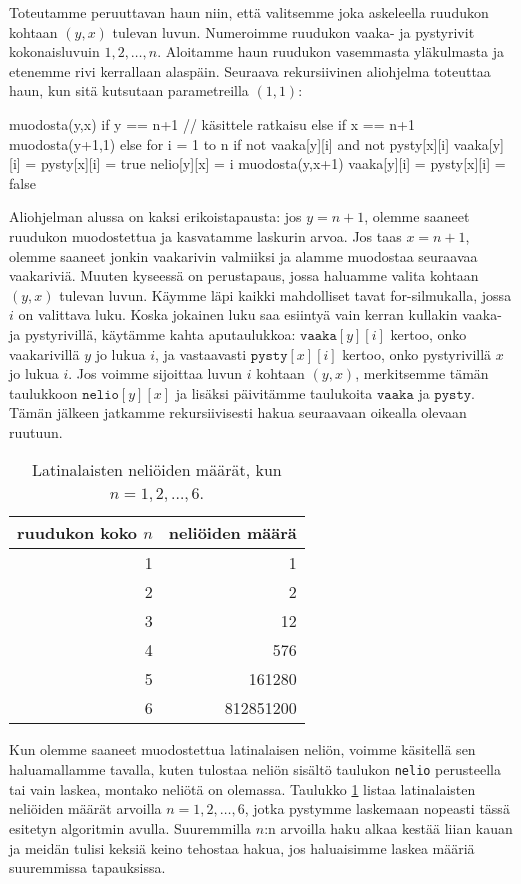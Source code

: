 Toteutamme peruuttavan haun niin, että valitsemme joka askeleella
ruudukon kohtaan $(y,x)$ tulevan luvun.
Numeroimme ruudukon vaaka- ja pystyrivit kokonaisluvuin $1,2,\dots,n$.
Aloitamme haun ruudukon vasemmasta yläkul\-masta ja etenemme
rivi kerrallaan alaspäin.
Seuraava rekursiivinen aliohjelma toteuttaa haun,
kun sitä kutsutaan parametreilla $(1,1)$:

\begin{code}
muodosta(y,x)
    if y == n+1
        // käsittele ratkaisu
    else if x == n+1
        muodosta(y+1,1)
    else
        for i = 1 to n
            if not vaaka[y][i] and not pysty[x][i]
                vaaka[y][i] = pysty[x][i] = true
                nelio[y][x] = i
                muodosta(y,x+1)
                vaaka[y][i] = pysty[x][i] = false
\end{code}

Aliohjelman alussa on kaksi erikoistapausta:
jos $y=n+1$, olemme saaneet ruudukon muodostettua
ja kasvatamme laskurin arvoa.
Jos taas $x=n+1$, olemme saaneet jonkin vaakarivin
valmiiksi ja alamme muodostaa seuraavaa vaakariviä.
Muuten kyseessä on perustapaus, jossa haluamme
valita kohtaan $(y,x)$ tulevan luvun.
Käymme läpi kaikki mahdolliset tavat for-silmukalla,
jossa $i$ on valittava luku.
Koska jokainen luku saa esiintyä vain kerran kullakin
vaaka- ja pystyrivillä, käytämme kahta aputaulukkoa:
$\texttt{vaaka}[y][i]$ kertoo, onko vaakarivillä $y$
jo lukua $i$, ja vastaavasti $\texttt{pysty}[x][i]$ kertoo,
onko pystyrivillä $x$ jo lukua $i$.
Jos voimme sijoittaa luvun $i$ kohtaan $(y,x)$,
merkitsemme tämän taulukkoon $\texttt{nelio}[y][x]$
ja lisäksi päivitämme taulukoita $\texttt{vaaka}$ ja $\texttt{pysty}$.
Tämän jälkeen jatkamme rekursiivisesti hakua seuraavaan
oikealla olevaan ruutuun.

\begin{table}
\center
\begin{tabular}{rr}
ruudukon koko $n$ & neliöiden määrä \\
\hline
1 & 1 \\
2 & 2 \\
3 & 12 \\
4 & 576 \\
5 & 161280 \\
6 & 812851200 \\
\end{tabular}
\caption{Latinalaisten neliöiden määrät, kun $n=1,2,\dots,6$.}
\label{tab:latnel}
\end{table}

Kun olemme saaneet muodostettua latinalaisen neliön, voimme käsitellä
sen haluamallamme tavalla, kuten tulostaa neliön sisältö
taulukon \texttt{nelio} perusteella
tai vain laskea, montako neliötä on olemassa.
Taulukko \ref{tab:latnel} listaa latinalaisten neliöiden
määrät arvoilla $n=1,2,\dots,6$, jotka pystymme laskemaan
nopeasti tässä esitetyn algoritmin avulla.
Suuremmilla $n$:n arvoilla haku alkaa kestää liian kauan
ja meidän tulisi keksiä keino tehostaa hakua,
jos haluaisimme laskea määriä suuremmissa tapauksissa.


